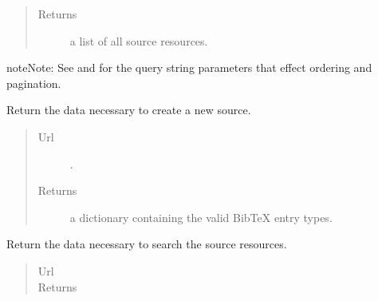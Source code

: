 \documentclass[letterpaper,10pt,english]{sphinxmanual}
\begin{document}
\begin{fulllineitems}
\begin{fulllineitems}
\begin{quote}
\begin{description}
\item[{Returns}] \leavevmode
a list of all source resources.

\end{description}\end{quote}

\begin{notice}{note}{Note:}
See  and  for the
query string parameters that effect ordering and pagination.
\end{notice}

\end{fulllineitems}


\begin{fulllineitems}
\label{api:onlinelinguisticdatabase.controllers.sources.SourcesController.new}
Return the data necessary to create a new source.
\begin{quote}\begin{description}
\item[{Url }] \leavevmode
{}.

\item[{Returns}] \leavevmode
a dictionary containing the valid BibTeX entry types.

\end{description}\end{quote}

\end{fulllineitems}


\begin{fulllineitems}
\label{api:onlinelinguisticdatabase.controllers.sources.SourcesController.new_search}
Return the data necessary to search the source resources.
\begin{quote}\begin{description}
\item[{Url }] \leavevmode
{}

\item[{Returns}] \leavevmode
{}

\end{description}\end{quote}


\end{fulllineitems}
\end{fulllineitems}
\end{document}
